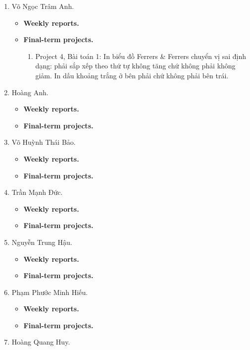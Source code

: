\documentclass{article}
\begin{document}
\begin{enumerate}
    \item {\sc Võ Ngọc Trâm Anh.}
    \begin{itemize}
        \item {\bf Weekly reports.}
        \item {\bf Final-term projects.}
        \begin{enumerate}
            \item Project 4, Bài toán 1: In biểu đồ Ferrers \& Ferrers chuyển vị sai định dạng: phải sắp xếp theo thứ tự không tăng chứ không phải không giảm. In dấu khoảng trắng ở bên phải chứ không phải bên trái.
        \end{enumerate}
    \end{itemize}
    \item {\sc Hoàng Anh.}
    \begin{itemize}
        \item {\bf Weekly reports.}
        \item {\bf Final-term projects.}
    \end{itemize}
    \item {\sc Võ Huỳnh Thái Bảo.}
    \begin{itemize}
        \item {\bf Weekly reports.}
        \item {\bf Final-term projects.}
    \end{itemize}
    \item {\sc Trần Mạnh Đức.}
    \begin{itemize}
        \item {\bf Weekly reports.}
        \item {\bf Final-term projects.}
    \end{itemize}
    \item {\sc Nguyễn Trung Hậu.}
    \begin{itemize}
        \item {\bf Weekly reports.}
        \item {\bf Final-term projects.}
    \end{itemize}
    \item {\sc Phạm Phước Minh Hiếu.}
    \begin{itemize}
        \item {\bf Weekly reports.}
        \item {\bf Final-term projects.}
    \end{itemize}
    \item {\sc Hoàng Quang Huy.}

\end{enumerate}
\end{document}
